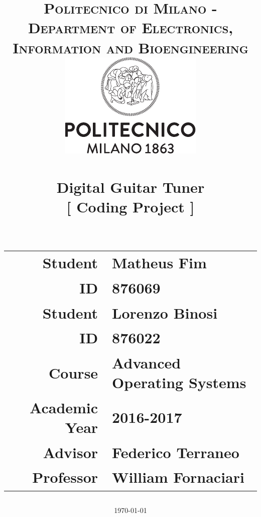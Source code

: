\documentclass[12pt, english]{scrartcl}
\title{\normalfont \normalsize 
\textsc{Politecnico di Milano - Department of Electronics, Information and Bioengineering} \\[1cm]
\includegraphics[scale=1.2]{polimi} \\[1cm]
\horrule{0.5pt} \\[0.4cm]
\huge \textbf{Digital Guitar Tuner} \\[.5cm] %
\large [ Coding Project ] \\ %
\horrule{2pt} \\[0.5cm]
\vfill
\author{}
\begin{tabular}{r l}
\textbf{Student} & Matheus Fim \\
\textbf{ID} & 876069 \\[0.5cm]
\textbf{Student} & Lorenzo Binosi \\
\textbf{ID} & 876022 \\[0.5cm]
\textbf{Course} & Advanced Operating Systems \\
\textbf{Academic Year} & 2016-2017 \\[0.5cm]
\textbf{Advisor} & Federico Terraneo \\ %
\textbf{Professor} & William Fornaciari \\
\end{tabular}
\date{\normalsize\today}
}
\begin{document}
\maketitle %

\pagebreak\tableofcontents\pagebreak

%



\pagebreak

\end{document}
